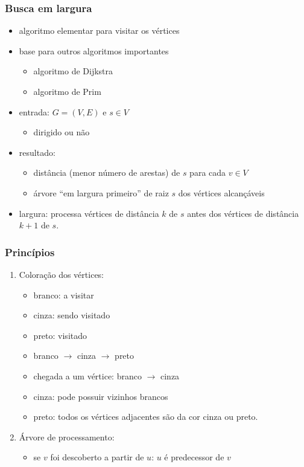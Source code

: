 \documentclass{beamer}
\begin{document}
\begin{frame}
\frametitle{Busca em largura}

\begin{itemize}
\item algoritmo elementar para visitar os vértices
\item base para outros algoritmos importantes
\begin{itemize}
\item algoritmo de Dijkstra
\item algoritmo de Prim
\end{itemize}
\item entrada: $G = (V, E)$ e $s \in V$
\begin{itemize}
\item dirigido ou não
\end{itemize}
\item resultado:
\begin{itemize}
\item distância (menor número de arestas) de $s$ para cada $v \in V$
\item árvore ``em largura primeiro'' de raiz $s$ dos vértices alcançáveis
\end{itemize}
\item \alert{largura}: processa vértices de distância $k$ de $s$ antes dos
vértices de distância $k+1$ de $s$.
\end{itemize}
\end{frame}

\begin{frame}

\frametitle{Princípios}

\begin{enumerate}
\item Coloração dos vértices: 
\begin{itemize}
\item branco: a visitar
\item cinza: sendo visitado
\item preto: visitado
\item branco $\rightarrow$ cinza $\rightarrow$ preto
\item chegada a um vértice: branco $\rightarrow$ cinza
\item cinza: pode possuir vizinhos brancos
\item preto: todos os vértices adjacentes são da cor cinza ou preto.
\end{itemize}
\item Árvore de processamento:
\begin{itemize}
\item se $v$ foi descoberto a partir de $u$: $u$ é \alert{predecessor} de $v$
\end{itemize}
\end{enumerate}
\end{frame}
\end{document}
